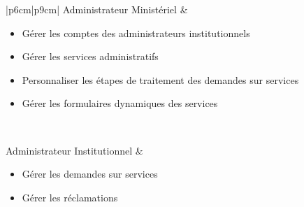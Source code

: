 \begin{longtable}{|p{6cm}|p{9cm}|}
Administrateur Ministériel &
\begin{minipage}[t]{\linewidth}
\begin{itemize}
    \item Gérer les comptes des administrateurs institutionnels
    \item Gérer les services administratifs
    \item Personnaliser les étapes de traitement des demandes sur services
    \item Gérer les formulaires dynamiques des services
\end{itemize}
\vspace{0.2cm}
\end{minipage}
\\
\hline

Administrateur Institutionnel &
\begin{minipage}[t]{\linewidth}
\begin{itemize}
    \item Gérer les demandes sur services
    \item Gérer les réclamations
\end{itemize}
\vspace{0.2cm}
\end{minipage}
\\
\hline

\caption{Besoins fonctionnels par acteur (partie administration)}
\label{tab:besoins_admin}

\end{longtable}



 
\renewcommand{\arraystretch}{1.3}
\setlength{\tabcolsep}{10pt}

